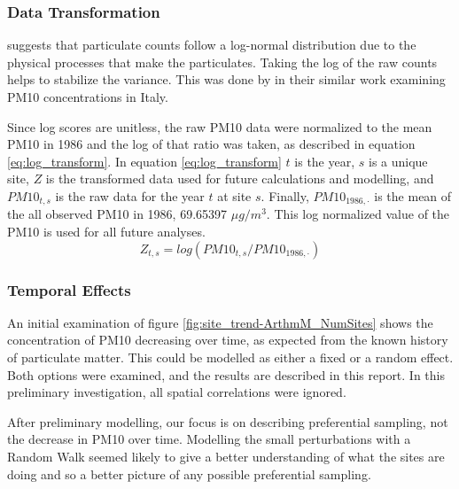 \subsubsection*{Data Transformation}
\label{subsubsec:datatrans}
\cite{ott1990} suggests that particulate counts follow a log-normal distribution due to the physical processes that make the particulates.  Taking the log of the raw counts helps to stabilize the variance.  This was done by \cite{cameletti2011spatio}  in their similar work examining PM10 concentrations in Italy.

Since log scores are unitless, the raw \ac{PM10} data were normalized to the mean \ac{PM10} in 1986 and the log of that ratio was taken, as described in equation \ref{eq:log_transform}.  In equation \ref{eq:log_transform} $t$ is the year, $s$ is a unique site, $Z$ is the transformed data used for future calculations and modelling, and $PM10_{t,s}$ is the raw data for the year $t$ at site $s$.  Finally, $PM10_{1986,\cdot}$ is the mean of the all observed \ac{PM10} in 1986, 69.65397 $\mu g/m^3$.  This log normalized value of the \ac{PM10} is used for all future analyses.
\begin{equation}
Z_{t,s} = log(PM10_{t,s}/ PM10_{1986,\cdot})
\end{equation} \label{eq:log_transform}


\subsubsection*{Temporal Effects}
\label{subsubsec:tempeffects}
An initial examination of figure \ref{fig:site_trend-ArthmM_NumSites} shows the concentration of \ac{PM10} decreasing over time, as expected from the known history of particulate matter.  This could be modelled as either a fixed or a random effect.  Both options were examined, and the results are described in this report.  In this preliminary investigation, all spatial correlations
were ignored.

After preliminary modelling, our focus is on describing preferential sampling, not the decrease in \ac{PM10} over time. Modelling the small perturbations with a Random Walk seemed likely to give a better understanding of what the sites are doing and so a better picture of any possible preferential sampling.  

